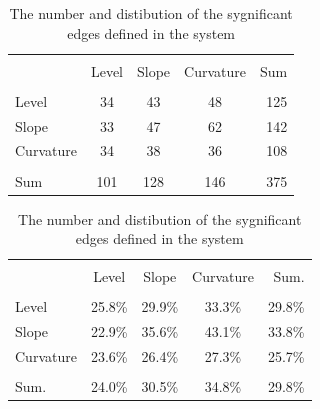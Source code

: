 \documentclass[12pt,bibliography=totoc]{article}
\begin{document}
\begin{table}[H]

\fontsize{9}{9}\selectfont
\centering
\begin{subtable}[t]{0.35\textwidth}
\centering
\begin{tabular}{l  ccc  r}%
\hline\hline \\ [-1.5ex]                         %

	&	Level 	&	Slope	&	Curvature	& Sum  \\ 
\hline \\ [-1.5ex]  
Level	&	34	&	43	&	48	&	 125	\\
Slope	&	33	&	47	&	62	&	142	\\
Curvature	&	34	&	38	&	36	&	108	\\
\hline \\ [-1.5ex]  
Sum	&	101	&	128	&	146	&	375	\\


\hline            
\end{tabular}
\caption{\textbf{Number of edges, grouped by factors}}
\label{tab:numberOfEdges}
\end{subtable}
\hspace{\fill}
\begin{subtable}[t]{0.5\textwidth}
\centering
\begin{tabular}{l  ccc  r}%
\hline\hline \\ [-1.5ex]                         %



	&	Level	&	Slope	&	Curvature	&	Sum.	\\
\hline \\ [-1.5ex] 
Level	&	25.8\%	&	29.9\%	&	33.3\%	&	29.8\%	\\
Slope	&	22.9\%	&	35.6\%	&	43.1\%	&	33.8\%	\\
Curvature	&23.6\%	&	26.4\%	&	27.3\%	&	25.7\%	\\
\hline \\ [-1.5ex]  
Sum.	&	24.0\%	&	30.5\%	&	34.8\%	&	29.8\%	\\
\hline  
\end{tabular}
\caption{\textbf{Distribution of edges, grouped by factors}}
\label{tab:distributionOfEdges}
\end{subtable}
\caption{The number and distibution of the sygnificant edges defined in the system} %
\label{tab:numberAndDistributionOfEdges}


\end{table}
\end{document}
